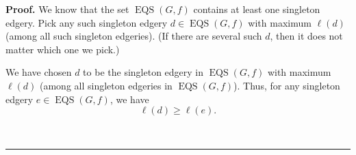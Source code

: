 \documentclass[numbers=enddot,12pt,final,onecolumn,notitlepage]{scrartcl}%
\theoremstyle{definition}
\newenvironment{proof}[1][Proof]{\noindent\textbf{#1.} }{\ \rule{0.5em}{0.5em}}
\newenvironment{verlong}{}{}
\begin{document}
\begin{proof}
\begin{verlong}
We know that the set $\operatorname*{EQS}\left(  G,f\right)  $ contains at
least one singleton edgery. Pick any such singleton edgery $d\in
\operatorname*{EQS}\left(  G,f\right)  $ with maximum $\ell\left(  d\right)  $
(among all such singleton edgeries). (If there are several such $d$, then it
does not matter which one we pick.)

We have chosen $d$ to be the singleton edgery in $\operatorname*{EQS}\left(
G,f\right)  $ with maximum $\ell\left(  d\right)  $ (among all singleton
edgeries in $\operatorname*{EQS}\left(  G,f\right)  $). Thus, for any
singleton edgery $e\in\operatorname*{EQS}\left(  G,f\right)  $, we have%
\begin{equation}
\ell\left(  d\right)  \geq\ell\left(  e\right)  .
\label{pf.lem.ambiNBCm.moeb.maxl}%
\end{equation}



\end{verlong}
\end{proof}
\end{document}
